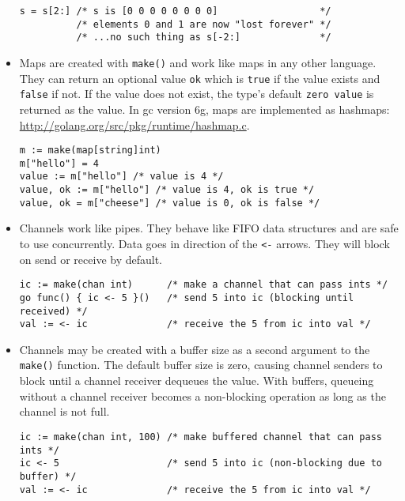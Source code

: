 \documentclass[12pt]{article}
\begin{document}
\begin{itemize}
\begin{verbatim}
s = s[2:] /* s is [0 0 0 0 0 0 0 0]                  */
          /* elements 0 and 1 are now "lost forever" */
          /* ...no such thing as s[-2:]              */
          \end{verbatim}
    \item Maps are created with \texttt{make()} and work like maps
        in any other language. They can return an optional value \texttt{ok}
        which is \texttt{true} if the value exists and \texttt{false} if not.
        If the value does not exist, the type's default \texttt{zero value}
        is returned as the value. In gc version 6g, maps are implemented as
        hashmaps: \url{http://golang.org/src/pkg/runtime/hashmap.c}.
        \begin{verbatim}
m := make(map[string]int)
m["hello"] = 4
value := m["hello"] /* value is 4 */
value, ok := m["hello"] /* value is 4, ok is true */
value, ok = m["cheese"] /* value is 0, ok is false */
\end{verbatim}
    \item Channels work like pipes. They behave like FIFO data structures
          and are safe to use concurrently. Data goes in direction of the
          \texttt{<-} arrows. They will block on send or receive by default.
        \begin{verbatim}
ic := make(chan int)      /* make a channel that can pass ints */
go func() { ic <- 5 }()   /* send 5 into ic (blocking until received) */
val := <- ic              /* receive the 5 from ic into val */
        \end{verbatim}
    \item Channels may be created with a buffer size as a second argument
          to the \texttt{make()} function. The default buffer size is zero,
          causing channel senders to block until a channel receiver dequeues
          the value. With buffers, queueing without a channel receiver becomes
          a non-blocking operation as long as the channel is not full.
        \begin{verbatim}
ic := make(chan int, 100) /* make buffered channel that can pass ints */
ic <- 5                   /* send 5 into ic (non-blocking due to buffer) */
val := <- ic              /* receive the 5 from ic into val */
        \end{verbatim}
\end{itemize}
\end{document}
